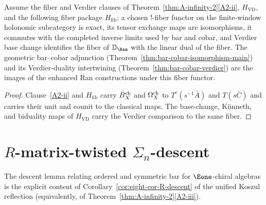 \begin{corollary}
\label{cor:classical-A-from-A-infinity-2}
Assume the fiber and Verdier clauses of
Theorem~\ref{thm:A-infinity-2}\ref{A2-ii}, $H_{\mathrm{VD}}$, and the
following fiber package $H_{\mathrm{fib}}$: a chosen !-fiber functor
on the finite-window holonomic subcategory is exact, its tensor
exchange maps are isomorphisms, it commutes with the completed inverse
limits used by bar and cobar, and Verdier base change identifies the
fiber of $\mathbb D_{\Ran}$ with the linear dual of the fiber.  The
geometric bar--cobar adjunction
\textup{(}Theorem~\textup{\ref{thm:bar-cobar-isomorphism-main}})
and its Verdier-duality intertwining
\textup{(}Theorem~\textup{\ref{thm:bar-cobar-verdier}}) are the images
of the enhanced Ran constructions under this fiber functor.
\end{corollary}

\begin{proof}
Clause~\ref{A2-ii} and $H_{\mathrm{fib}}$ carry $\bar{B}^{\mathrm{ch}}_X$ and $\Omega^{\mathrm{ch}}_X$ to
$T^c(s^{-1}\bar A)$ and $T(s\bar C)$ and carries their unit and counit
to the classical maps.  The base-change, K\"unneth, and biduality maps
of $H_{\mathrm{VD}}$ carry the Verdier comparison to the same fiber.
\end{proof}

\section{$R$-matrix-twisted $\Sigma_n$-descent}\label{sec:ainf2-R-descent}

The descent lemma relating ordered and symmetric bar for
$\Eone$-chiral algebras is the explicit content of
Corollary~\ref{cor:eight-cor-R-descent} of the unified Koszul
reflection (equivalently, of
Theorem~\ref{thm:A-infinity-2}\ref{A2-iii}).

